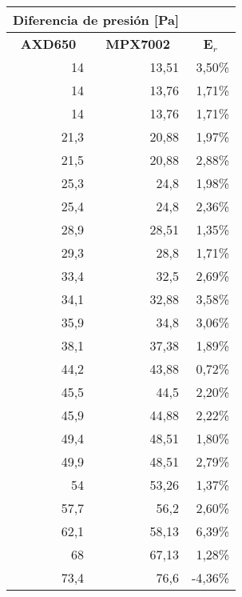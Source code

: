 \begin{table}[H]%
		\centering
		\begin{tabular}{|r|r|r}
			\cline{1-2}
			\multicolumn{2}{|c|}{Diferencia de presión {[}Pa{]}} & \multicolumn{1}{c}{} \\ \hline
			\multicolumn{1}{|c|}{\textbf{AXD650}} & \multicolumn{1}{c|}{\textbf{MPX7002}} & \multicolumn{1}{c|}{\textbf{E$_r$}} \\ \hline
			14 & 13,51 & \multicolumn{1}{r|}{3,50\%} \\ \hline
			14 & 13,76 & \multicolumn{1}{r|}{1,71\%} \\ \hline
			14 & 13,76 & \multicolumn{1}{r|}{1,71\%} \\ \hline
			21,3 & 20,88 & \multicolumn{1}{r|}{1,97\%} \\ \hline
			21,5 & 20,88 & \multicolumn{1}{r|}{2,88\%} \\ \hline
			25,3 & 24,8 & \multicolumn{1}{r|}{1,98\%} \\ \hline
			25,4 & 24,8 & \multicolumn{1}{r|}{2,36\%} \\ \hline
			28,9 & 28,51 & \multicolumn{1}{r|}{1,35\%} \\ \hline
			29,3 & 28,8 & \multicolumn{1}{r|}{1,71\%} \\ \hline
			33,4 & 32,5 & \multicolumn{1}{r|}{2,69\%} \\ \hline
			34,1 & 32,88 & \multicolumn{1}{r|}{3,58\%} \\ \hline
			35,9 & 34,8 & \multicolumn{1}{r|}{3,06\%} \\ \hline
			38,1 & 37,38 & \multicolumn{1}{r|}{1,89\%} \\ \hline
			44,2 & 43,88 & \multicolumn{1}{r|}{0,72\%} \\ \hline
			45,5 & 44,5 & \multicolumn{1}{r|}{2,20\%} \\ \hline
			45,9 & 44,88 & \multicolumn{1}{r|}{2,22\%} \\ \hline
			49,4 & 48,51 & \multicolumn{1}{r|}{1,80\%} \\ \hline
			49,9 & 48,51 & \multicolumn{1}{r|}{2,79\%} \\ \hline
			54 & 53,26 & \multicolumn{1}{r|}{1,37\%} \\ \hline
			57,7 & 56,2 & \multicolumn{1}{r|}{2,60\%} \\ \hline
			62,1 & 58,13 & \multicolumn{1}{r|}{6,39\%} \\ \hline
			68 & 67,13 & \multicolumn{1}{r|}{1,28\%} \\ \hline
			73,4 & 76,6 & \multicolumn{1}{r|}{-4,36\%} \\ \hline

\end{tabular}
\end{table}
